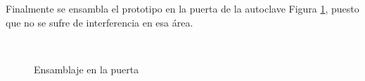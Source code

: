 Finalmente se ensambla el prototipo en la puerta de la autoclave Figura \ref{fig:fin}, puesto que no se sufre de interferencia en esa área.
\begin{figure}[hpt]
    \centering
    \caption{Ensamblaje en la puerta}
            \qquad      %
        \\
    \label{fig:fin}
\end{figure}
\newpage
